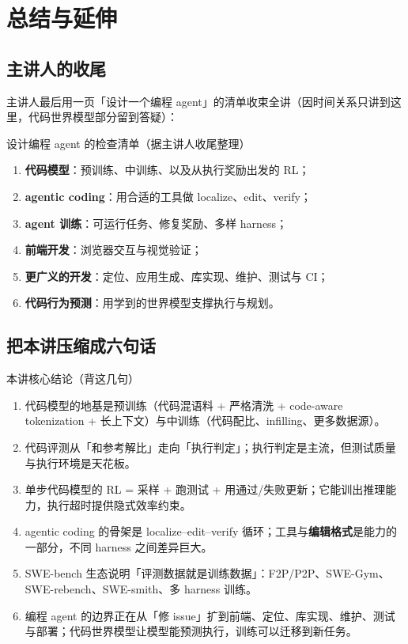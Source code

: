 ﻿\documentclass[a4paper]{article}
\begin{document}
\section{总结与延伸}

\subsection{主讲人的收尾}

主讲人最后用一页「设计一个编程 agent」的清单收束全讲（因时间关系只讲到这里，代码世界模型部分留到答疑）：

\begin{importantbox}{设计编程 agent 的检查清单（据主讲人收尾整理）}
\begin{enumerate}
\item \textbf{代码模型}：预训练、中训练、以及从执行奖励出发的 RL；
\item \textbf{agentic coding}：用合适的工具做 localize、edit、verify；
\item \textbf{agent 训练}：可运行任务、修复奖励、多样 harness；
\item \textbf{前端开发}：浏览器交互与视觉验证；
\item \textbf{更广义的开发}：定位、应用生成、库实现、维护、测试与 CI；
\item \textbf{代码行为预测}：用学到的世界模型支撑执行与规划。
\end{enumerate}
\end{importantbox}

\subsection{把本讲压缩成六句话}

\begin{importantbox}{本讲核心结论（背这几句）}
\begin{enumerate}
\item 代码模型的地基是预训练（代码混语料 + 严格清洗 + code-aware tokenization + 长上下文）与中训练（代码配比、infilling、更多数据源）。
\item 代码评测从「和参考解比」走向「执行判定」；执行判定是主流，但测试质量与执行环境是天花板。
\item 单步代码模型的 RL = 采样 + 跑测试 + 用通过/失败更新；它能训出推理能力，执行超时提供隐式效率约束。
\item agentic coding 的骨架是 localize--edit--verify 循环；工具与\textbf{编辑格式}是能力的一部分，不同 harness 之间差异巨大。
\item SWE-bench 生态说明「评测数据就是训练数据」：F2P/P2P、SWE-Gym、SWE-rebench、SWE-smith、多 harness 训练。
\item 编程 agent 的边界正在从「修 issue」扩到前端、定位、库实现、维护、测试与部署；代码世界模型让模型能预测执行，训练可以迁移到新任务。
\end{enumerate}
\end{importantbox}
\end{document}
